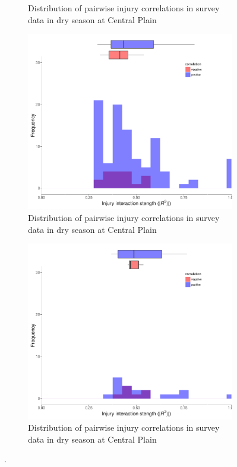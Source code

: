 \begin{figure}
\begin{subfigure}[b]{0.5\textwidth}
        \caption{Distribution of pairwise injury correlations in survey data in dry season at Central Plain}
        \label{fig:cortest8}
    \end{subfigure}
\begin{subfigure}[b]{0.5\textwidth}
        \includegraphics[width = 1\textwidth]{figures/combinedplotWJ_ds.pdf}
        \caption{Distribution of pairwise injury correlations in survey data in dry season at Central Plain}
        \label{fig:cortest9}
    \end{subfigure}
\begin{subfigure}[b]{0.5\textwidth}
        \includegraphics[width = 1\textwidth]{figures/combinedplotWJ_ws.pdf}
        \caption{Distribution of pairwise injury correlations in survey data in dry season at Central Plain}
        \label{fig:cortest10}
    \end{subfigure}
\caption{.}
    \label{fig:corfretest2}
\end{figure}

